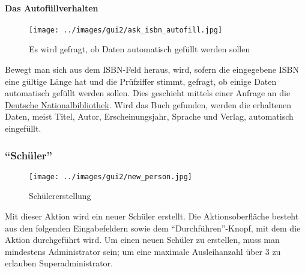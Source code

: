 \paragraph{Das Autofüllverhalten}
\begin{figure}\texttt{[image: ../images/gui2/ask\_isbn\_autofill.jpg]}\caption{Es wird gefragt, ob Daten automatisch gefüllt werden sollen}\label{fig:ask_isbn_autofill}\end{figure}

Bewegt man sich aus dem ISBN-Feld heraus, wird, sofern die eingegebene ISBN eine gültige Länge hat und die Prüfziffer stimmt, gefragt, ob einige Daten automatisch gefüllt werden sollen.
Dies geschieht mittels einer Anfrage an die \href{https://portal.dnb.de}{Deutsche Nationalbibliothek}.
Wird das Buch gefunden, werden die erhaltenen Daten, meist Titel, Autor, Erscheinungsjahr, Sprache und Verlag, automatisch eingefüllt.



\subsubsection{``Schüler''}
\label{subsubsec:detail:new:person}
\begin{figure}\texttt{[image: ../images/gui2/new\_person.jpg]}\caption{Schülererstellung}\label{fig:new_person}\end{figure}

Mit dieser Aktion wird ein neuer Schüler erstellt. Die Aktionsoberfläche besteht aus den folgenden Eingabefeldern sowie dem ``Durchführen''-Knopf, mit dem die Aktion durchgeführt wird.
Um einen neuen Schüler zu erstellen, muss man mindestens Administrator sein; um eine maximale Ausleihanzahl über 3 zu erlauben Superadministrator.

